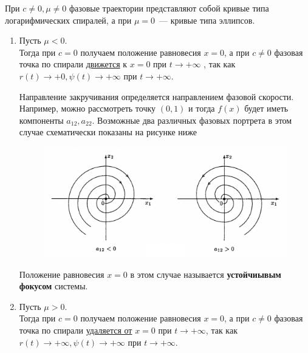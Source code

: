 \begin{enumerate}
    При $c \neq 0, \mu \neq 0$ фазовые траектории представляют собой кривые типа логарифмических спиралей, а при $\mu = 0$~--- кривые типа эллипсов.
    \begin{enumerate}
    \item Пусть $\mu < 0$.\\
        Тогда при $c = 0$ получаем положение равновесия $x=0$, а при $c \neq 0$ фазовая точка по спирали \underline{движется} к $x=0$ при \(t \longrightarrow +\infty\) , так как $r(t) \longrightarrow +0, \psi(t) \longrightarrow +\infty$ при \(t \longrightarrow +\infty\).
        
        Направление закручивания определяется направлением фазовой скорости. Например, можно рассмотреть точку $(0, 1)$ и тогда $f(x)$ будет иметь компоненты $a_{12}, a_{22}$. Возможные два различных фазовых портрета в этом случае схематически показаны на рисунке ниже
        \begin{figure}[H]\label{autonom-compla}
                \centering
                \includegraphics[scale=0.6]{sections/Sasha/images/autonom-compla.png}
                \caption{}
        \end{figure}
        Положение равновесия $x=0$ в этом случае называется \textbf{устойчиывым фокусом} системы.
    
    \item Пусть $\mu > 0$.\\
        Тогда при $c = 0$ получаем положение равновесия $x=0$, а при $c \neq 0$ фазовая точка по спирали \underline{удаляется от} $x=0$ при \(t \longrightarrow +\infty\), так как $r(t) \longrightarrow +\infty, \psi(t) \longrightarrow +\infty$ при \(t \longrightarrow +\infty\).
        

\end{enumerate}
\end{enumerate}
